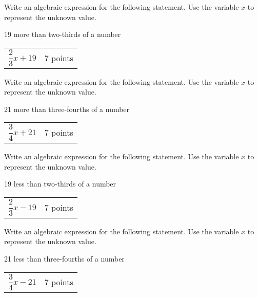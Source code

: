 {
	Write an algebraic expression for the following statement. Use the variable $x$ to represent the unknown value.
	
	19 more than two-thirds of a number
}
{
	\begin{tabular}{l r}
	$\dfrac{2}{3}x+19$ & 7 points\\
	\end{tabular}
}

{
	Write an algebraic expression for the following statement. Use the variable $x$ to represent the unknown value.
	
	21 more than three-fourths of a number
}
{
	\begin{tabular}{l r}
	$\dfrac{3}{4}x+21$ & 7 points\\
	\end{tabular}
}

{
	Write an algebraic expression for the following statement. Use the variable $x$ to represent the unknown value.
	
	19 less than two-thirds of a number
}
{
	\begin{tabular}{l r}
	$\dfrac{2}{3}x-19$ & 7 points\\
	\end{tabular}
}

{
	Write an algebraic expression for the following statement. Use the variable $x$ to represent the unknown value.
	
	21 less than three-fourths of a number
}
{
	\begin{tabular}{l r}
	$\dfrac{3}{4}x-21$ & 7 points\\
	\end{tabular}
}
